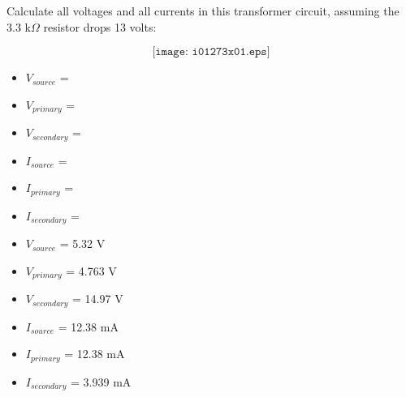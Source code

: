 

Calculate all voltages and all currents in this transformer circuit, assuming the 3.3 k$\Omega$ resistor drops 13 volts:

$$\texttt{[image: i01273x01.eps]}$$

\begin{itemize}
\item{} $V_{source}$ = 
\item{} $V_{primary}$ = 
\item{} $V_{secondary}$ = 
\item{} $I_{source}$ =  
\item{} $I_{primary}$ = 
\item{} $I_{secondary}$ = 
\end{itemize}







\begin{itemize}
\item{} $V_{source}$ = 5.32 V
\item{} $V_{primary}$ = 4.763 V
\item{} $V_{secondary}$ = 14.97 V
\item{} $I_{source}$ = 12.38 mA
\item{} $I_{primary}$ = 12.38 mA
\item{} $I_{secondary}$ = 3.939 mA
\end{itemize}
 










